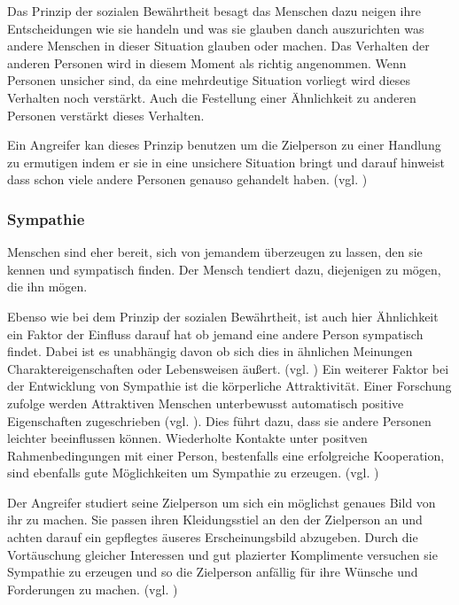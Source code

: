 Das Prinzip der sozialen Bewährtheit besagt das Menschen dazu neigen ihre Entscheidungen wie sie handeln und was sie glauben danch auszurichten was andere Menschen in dieser Situation glauben oder machen. Das Verhalten der anderen Personen wird in diesem Moment als richtig angenommen. Wenn Personen unsicher sind, da eine mehrdeutige Situation vorliegt wird dieses Verhalten noch verstärkt. Auch die Festellung einer Ähnlichkeit zu anderen Personen verstärkt dieses Verhalten.

Ein Angreifer kan dieses Prinzip benutzen um die Zielperson zu einer Handlung zu ermutigen indem er sie in eine unsichere Situation bringt und darauf hinweist dass schon viele andere Personen genauso gehandelt haben. (vgl. \cite{PsychDesÜberzeugensSozBew})


\subsubsection{Sympathie}

\glqq Menschen sind eher bereit, sich von jemandem überzeugen zu lassen, den sie kennen und sympatisch finden.\grqq{} \cite{PsychDesÜberzeugensSym}
Der Mensch tendiert dazu, diejenigen zu mögen, die ihn mögen. \cite{sym}

Ebenso wie bei dem Prinzip der sozialen Bewährtheit, ist auch hier Ähnlichkeit ein Faktor der Einfluss darauf hat ob jemand eine andere Person sympatisch findet. Dabei ist es unabhängig davon ob sich dies in ähnlichen Meinungen Charaktereigenschaften oder Lebensweisen äußert. (vgl. \cite{sym1})
Ein weiterer Faktor bei der Entwicklung von Sympathie ist die körperliche Attraktivität. Einer Forschung zufolge werden Attraktiven Menschen unterbewusst automatisch positive Eigenschaften zugeschrieben (vgl. \cite{sym2}). Dies führt dazu, dass sie andere Personen leichter beeinflussen können. 
Wiederholte Kontakte unter positven Rahmenbedingungen mit einer Person, bestenfalls eine erfolgreiche Kooperation, sind ebenfalls gute Möglichkeiten um Sympathie zu erzeugen. (vgl. \cite{PsychDesÜberzeugensSymp})

Der Angreifer studiert seine Zielperson um sich ein möglichst genaues Bild von ihr zu machen. Sie passen ihren Kleidungsstiel an den der Zielperson an und achten darauf ein gepflegtes äuseres Erscheinungsbild abzugeben. Durch die Vortäuschung gleicher Interessen und gut plazierter Komplimente versuchen sie Sympathie zu erzeugen und so die Zielperson anfällig für ihre Wünsche und Forderungen zu machen. (vgl. \cite{PsychDesÜberzeugensSymp})


